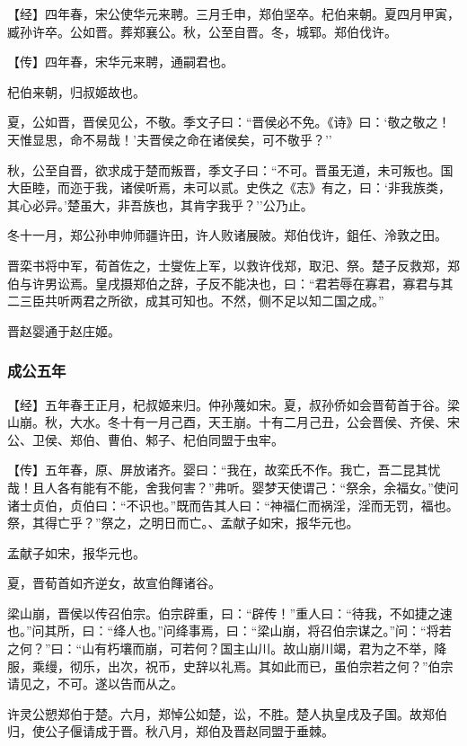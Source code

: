 \documentclass[]{article}
\begin{document}
【经】四年春，宋公使华元来聘。三月壬申，郑伯坚卒。杞伯来朝。夏四月甲寅，臧孙许卒。公如晋。葬郑襄公。秋，公至自晋。冬，城郓。郑伯伐许。

【传】四年春，宋华元来聘，通嗣君也。

杞伯来朝，归叔姬故也。

夏，公如晋，晋侯见公，不敬。季文子曰：``晋侯必不免。《诗》曰：`敬之敬之！天惟显思，命不易哉！'夫晋侯之命在诸侯矣，可不敬乎？''

秋，公至自晋，欲求成于楚而叛晋，季文子曰：``不可。晋虽无道，未可叛也。国大臣睦，而迩于我，诸侯听焉，未可以贰。史佚之《志》有之，曰：`非我族类，其心必异。'楚虽大，非吾族也，其肯字我乎？''公乃止。

冬十一月，郑公孙申帅师疆许田，许人败诸展陂。郑伯伐许，鉏任、泠敦之田。

晋栾书将中军，荀首佐之，士燮佐上军，以救许伐郑，取汜、祭。楚子反救郑，郑伯与许男讼焉。皇戌摄郑伯之辞，子反不能决也，曰：``君若辱在寡君，寡君与其二三臣共听两君之所欲，成其可知也。不然，侧不足以知二国之成。''

晋赵婴通于赵庄姬。

\hypertarget{header-n1584}{%
\subsubsection{成公五年}\label{header-n1584}}

【经】五年春王正月，杞叔姬来归。仲孙蔑如宋。夏，叔孙侨如会晋荀首于谷。梁山崩。秋，大水。冬十有一月己酉，天王崩。十有二月己丑，公会晋侯、齐侯、宋公、卫侯、郑伯、曹伯、邾子、杞伯同盟于虫牢。

【传】五年春，原、屏放诸齐。婴曰：``我在，故栾氏不作。我亡，吾二昆其忧哉！且人各有能有不能，舍我何害？''弗听。婴梦天使谓己：``祭余，余福女。''使问诸士贞伯，贞伯曰：``不识也。''既而告其人曰：``神福仁而祸淫，淫而无罚，福也。祭，其得亡乎？''祭之，之明日而亡。、孟献子如宋，报华元也。

孟献子如宋，报华元也。

夏，晋荀首如齐逆女，故宣伯餫诸谷。

梁山崩，晋侯以传召伯宗。伯宗辟重，曰：``辟传！''重人曰：``待我，不如捷之速也。''问其所，曰：``绛人也。''问绛事焉，曰：``梁山崩，将召伯宗谋之。''问：``将若之何？''曰：``山有朽壤而崩，可若何？国主山川。故山崩川竭，君为之不举，降服，乘缦，彻乐，出次，祝币，史辞以礼焉。其如此而已，虽伯宗若之何？''伯宗请见之，不可。遂以告而从之。

许灵公愬郑伯于楚。六月，郑悼公如楚，讼，不胜。楚人执皇戌及子国。故郑伯归，使公子偃请成于晋。秋八月，郑伯及晋赵同盟于垂棘。
\end{document}
